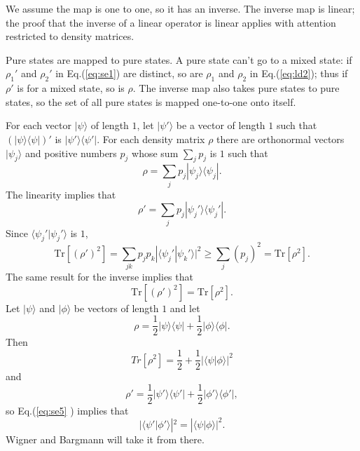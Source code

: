 \documentclass[pra, 12pt, showkeys, eqsecnum]{revtex4}
\newcommand {\Tr} {{\mbox{Tr}}}
\begin{document}
We assume the map is one to one, so it has an inverse. The inverse map is linear; the proof that the inverse of a linear operator is linear\cite[Theorem 7.1]{meLinearOperators} applies with attention restricted to density matrices.

Pure states are mapped to pure states. A pure state can't go to a mixed state: if $\rho_1'$ and $\rho_2'$ in Eq.(\ref{eq:se1}) are distinct, so are $\rho _1$ and $\rho _2$ in Eq.(\ref{eq:ld2}); thus if $\rho '$ is for a mixed state, so is $\rho $. The inverse map also takes pure states to pure states, so the set of all pure states is mapped one-to-one onto itself.

For each vector $|\psi \rangle$ of length $1$, let $|\psi '\rangle$ be a vector of length $1$ such that $(|\psi \rangle \langle \psi |)'$ is $|\psi '\rangle \langle\psi '|$. For each density matrix $\rho $ there are orthonormal vectors $|\psi_j \rangle$ and positive numbers $p_j$ whose sum $\sum_j p_j$ is $1$ such that
\begin{equation}
\label{eq:se2}
\rho  = \sum_j p_j|\psi_j \rangle \langle \psi_j |.
\end{equation}
The linearity implies that
\begin{equation}
\label{eq:se3}
\rho ' = \sum_j p_j |\psi_j' \rangle \langle \psi_j' |.
\end{equation}
Since $\langle \psi_j' |\psi_j' \rangle$ is $1$,
\begin{equation}
\label{eq:se4}
\Tr[(\rho' )^2] = \sum_{jk} p_j p_k |\langle \psi_j' |\psi_k' \rangle |^2 \geq \sum_j (p_j)^2 = \Tr[\rho^2 ].
\end{equation}
The same result for the inverse implies that
\begin{equation}
\label{eq:se5}
\Tr[(\rho ')^2] = \Tr[\rho^2].
\end{equation}
Let $|\psi \rangle$ and $|\phi \rangle$ be vectors of length $1$ and let
\begin{equation}
\label{eq:se6}
\rho  = \frac{1}{2} |\psi \rangle \langle \psi | + \frac{1}{2} |\phi \rangle \langle \phi |.
\end{equation}
Then
\begin{equation}
\label{eq:se7}
Tr[\rho ^2] = \frac{1}{2} + \frac{1}{2} |\langle \psi |\phi \rangle |^2
\end{equation}
and
\begin{equation}
\label{eq:se8}
\rho ' = \frac{1}{2} |\psi '\rangle \langle \psi '| + \frac{1}{2} |\phi '\rangle \langle \phi '|,
\end{equation}
so Eq.(\ref{eq:se5} ) implies that
\begin{equation}
\label{eq:se9}
|\langle \psi '|\phi '\rangle |^2 = |\langle \psi |\phi \rangle |^2.
\end{equation}
Wigner and Bargmann will take it from there.
\end{document}
